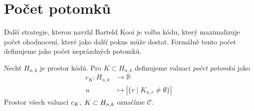 












\section{Počet potomků}
Další strategie, kterou navrhl Barteld Kooi \cite{kooi} je volba kódu, který maximalizuje počet ohodnocení, které jako další pokus může dostat. Formálně tento počet definujeme jako počet neprázdných potomků.
\begin{definice}
    Nechť $H_{n,k}$ je prostor kódů. Pro $K \subset H_{n,k}$ definujeme valuaci \emph{počet potomků} jako
    \begin{align*}
        c_K \colon H_{n,k} &\to \mathbb{R} \\
        u &\mapsto |\{r \mid K_{u,r} \neq \emptyset\}|
    \end{align*}
    Prostor všech valuací $c_K, \hspace{3px} K \subset H_{n,k}$ označíme $\mathcal{C}$. 
\end{definice}

